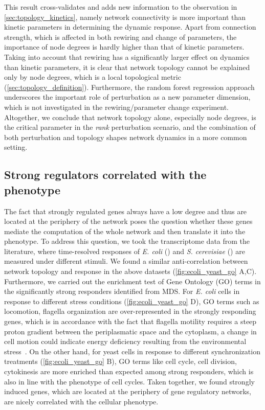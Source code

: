 This result cross-validates and adds new information to 
the observation in 
\ref{sec:topology_kinetics}, namely network connectivity is
more important than kinetic parameters in determining the 
dynamic response. Apart from connection strength, which is 
affected in
both rewiring and change of parameters, the importance of 
node degrees is hardly higher than that of kinetic parameters.
Taking into account that rewiring has a significantly larger
effect on dynamics than kinetic parameters, it is clear that
network topology cannot be explained only by node degrees,
which is a local topological metric 
(\ref{sec:topology_definition}). Furthermore, the random
forest regression approach underscores the important role of 
perturbation 
as a new parameter dimension, which is not investigated in
the rewiring/parameter change experiment.
Altogether, we conclude that
network topology alone, especially node degrees, is the 
critical parameter in the \emph{rank} perturbation scenario, 
and the combination of both perturbation and topology shapes
network dynamics in a more common setting.

\subsection{Strong regulators correlated with the phenotype}
\label{sec:strong_regulator_phenotype}
The fact that strongly regulated genes always have a low degree and thus are
located at the periphery of the network poses the question whether these genes
mediate the computation of the whole network and then translate it into the 
phenotype. To address this question, we took the transcriptome data from the literature,
where time-resolved responses of \emph{E. coli} (\citealp{Jozefczuk2010}) and 
\emph{S. cerevisiae} (\citealp{Spellman1998,Cho1998}) are
measured under different stimuli. We found a similar anti-correlation between
network topology and response in the above datasets (\ref{fig:ecoli_yeast_go} A,C). Furthermore, we
carried out the enrichment test of Gene Ontology (GO) terms in the significantly 
strong responders identified from MDS. 
For \emph{E. coli} cells in response
to different stress conditions (\ref{fig:ecoli_yeast_go} D), GO terms such as 
locomotion, flagella organization
are over-represented in the strongly responding genes, which is in accordance
with the fact that flagella motility requires a steep proton gradient between 
the periplasmatic space and the cytoplasm, a change in cell motion could 
indicate energy deficiency resulting from the environmental stress~\citep{Jozefczuk2010}. 
On the other hand, for yeast cells in response to different synchronization
treatments (\ref{fig:ecoli_yeast_go} B), GO terms like cell cycle, cell division, cytokinesis are more 
enriched than expected among strong responders, which is also in line with the
phenotype of cell cycles. Taken together, we found strongly induced genes, 
which are located at the periphery of gene regulatory networks, are nicely
correlated with the cellular phenotype.

